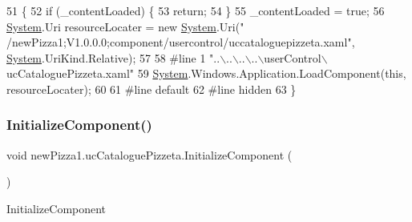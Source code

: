 \begin{DoxyCode}
51                                           \{
52             \textcolor{keywordflow}{if} (\_contentLoaded) \{
53                 \textcolor{keywordflow}{return};
54             \}
55             \_contentLoaded = \textcolor{keyword}{true};
56             \hyperlink{namespaceSystem}{System}.Uri resourceLocater = \textcolor{keyword}{new} \hyperlink{namespaceSystem}{System}.Uri(\textcolor{stringliteral}{"
      /newPizza1;V1.0.0.0;component/usercontrol/uccataloguepizzeta.xaml"}, \hyperlink{namespaceSystem}{System}.UriKind.Relative);
57             
58 \textcolor{preprocessor}{            #line 1 "..\(\backslash\)..\(\backslash\)..\(\backslash\)..\(\backslash\)userControl\(\backslash\)ucCataloguePizzeta.xaml"}
59             \hyperlink{namespaceSystem}{System}.Windows.Application.LoadComponent(\textcolor{keyword}{this}, resourceLocater);
60             
61 \textcolor{preprocessor}{            #line default}
62 \textcolor{preprocessor}{            #line hidden}
63         \}
\end{DoxyCode}
\mbox{\label{classnewPizza1_1_1ucCataloguePizzeta_afdbc12c0fdebf3e506da6fe56e30af7b}} 
\subsubsection{\texorpdfstring{Initialize\+Component()}{InitializeComponent()}\hspace{0.1cm}{\footnotesize\ttfamily [5/6]}}
{\footnotesize\ttfamily void new\+Pizza1.\+uc\+Catalogue\+Pizzeta.\+Initialize\+Component (\begin{DoxyParamCaption}{ }\end{DoxyParamCaption})\hspace{0.3cm}{\ttfamily [inline]}}



Initialize\+Component 


